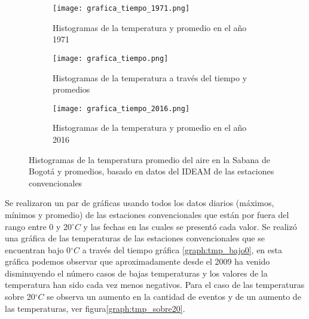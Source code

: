 \documentclass[11pt]{article}
\def\celc{$^{\circ}C$ }%
\begin{document}
\begin{figure}[H]
	
	\begin{subfigure}[b]{\linewidth}
	\begin{center}
	\texttt{[image: grafica\_tiempo\_1971.png]}
		
		\caption{Histogramas de la temperatura y promedio en el año 1971}		
		\label{graph:histo_tiempo_1971}
		
	\end{center}
	\end{subfigure}

	\begin{subfigure}[b]{\linewidth}
	\begin{center}
	\texttt{[image: grafica\_tiempo.png]}
		
		\caption{Histogramas de la temperatura a través del tiempo y promedios}		
		\label{graph:histo_tiempo}
		
	\end{center}
	\end{subfigure}
	
	\begin{subfigure}[b]{\linewidth}
	\begin{center}
	\texttt{[image: grafica\_tiempo\_2016.png]}
		
		\caption{Histogramas de la temperatura y promedio en el año 2016}		
		\label{graph:histo_tiempo_2016}
		
	\end{center}
	\end{subfigure}
	
	
	\caption{Histogramas de la temperatura promedio del aire en la Sabana de Bogotá y promedios, basado en datos del IDEAM de las estaciones convencionales}		
	\label{graph:evol_tmp_sabana} 
		
\end{figure}

Se realizaron un par de gráficas usando todos los datos diarios (máximos, mínimos y promedio) de las estaciones convencionales que están por fuera del rango entre 0 y 20\celc y las fechas en las cuales se presentó cada valor. Se realizó una gráfica de las temperaturas de las estaciones convencionales que se encuentran bajo 0\celc a través del tiempo gráfica \ref{graph:tmp_bajo0}, en esta gráfica podemos observar que aproximadamente desde el 2009 ha venido disminuyendo el número casos de bajas temperaturas y los valores de la temperatura han sido cada vez menos negativos. Para el caso de las temperaturas sobre 20\celc se observa un aumento en la cantidad de eventos y de un aumento de las temperaturas, ver figura\ref{graph:tmp_sobre20}.
\end{document}
